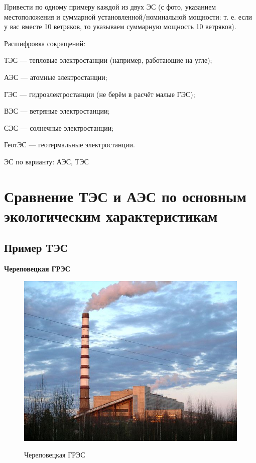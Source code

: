 \documentclass[a4paper,12pt]{article}
\begin{document}
	Привести по одному примеру каждой из двух ЭС (с фото, указанием
	местоположения и суммарной установленной/номинальной мощности: т. е. если
	у вас вместе 10 ветряков, то указываем суммарную мощность 10 ветряков).
	
	Расшифровка сокращений:
	
	ТЭС — тепловые электростанции (например, работающие на угле);
	
	АЭС — атомные электростанции;
	
	ГЭС — гидроэлектростанции (не берём в расчёт малые ГЭС);
	
	ВЭС — ветряные электростанции;
	
	СЭС — солнечные электростанции;
	
	ГеотЭС — геотермальные электростанции.
	
	ЭС по варианту: АЭС, ТЭС
	
	
	\section*{Сравнение ТЭС и АЭС по основным экологическим характеристикам}
	
	\subsection*{Пример ТЭС}
	
	{\bf Череповецкая ГРЭС}
	
	\begin{figure}[h!]
		\begin{center}
			{\includegraphics[scale = 0.6]{gres.jpg}}
			\label{ГРЭС}
		\end{center}
		\caption{Череповецкая ГРЭС}
	\end{figure}
	
\end{document}
